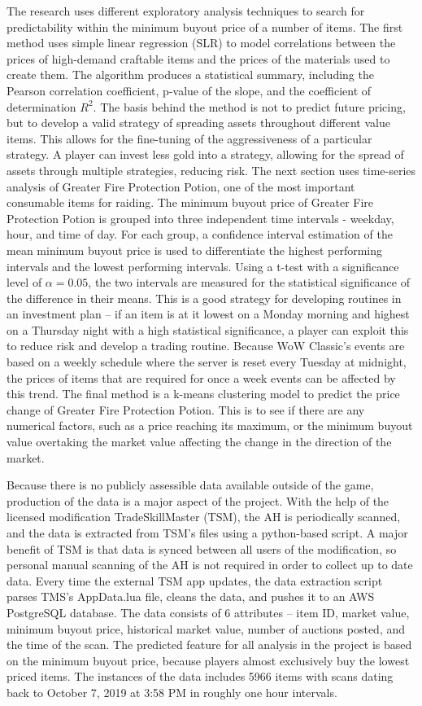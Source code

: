 \documentclass[sigconf]{acmart}
\begin{document}
The research uses different exploratory analysis techniques to search for predictability within the minimum buyout price of a number of items. The first method uses simple linear regression (SLR) to model correlations between the prices of high-demand craftable items and the prices of the materials used to create them. The algorithm produces a statistical summary, including the Pearson correlation coefficient, p-value of the slope, and the coefficient of determination \( R^2 \). The basis behind the method is not to predict future pricing, but to develop a valid strategy of spreading assets throughout different value items. This allows for the fine-tuning of the aggressiveness of a particular strategy. A player can invest less gold into a strategy, allowing for the spread of assets through multiple strategies, reducing risk. The next section uses time-series analysis of Greater Fire Protection Potion, one of the most important consumable items for raiding. The minimum buyout price of Greater Fire Protection Potion is grouped into three independent time intervals - weekday, hour, and time of day. For each group, a confidence interval estimation of the mean minimum buyout price is used to differentiate the highest performing intervals and the lowest performing intervals. Using a t-test with a significance level of \( \alpha = 0.05 \), the two intervals are measured for the statistical significance of the difference in their means. This is a good strategy for developing routines in an investment plan – if an item is at it lowest on a Monday morning and highest on a Thursday night with a high statistical significance, a player can exploit this to reduce risk and develop a trading routine. Because WoW Classic’s events are based on a weekly schedule where the server is reset every Tuesday at midnight, the prices of items that are required for once a week events can be affected by this trend. The final method is a k-means clustering model to predict the price change of Greater Fire Protection Potion. This is to see if there are any numerical factors, such as a price reaching its maximum, or the minimum buyout value overtaking the market value affecting the change in the direction of the market.

Because there is no publicly assessible data available outside of the game, production of the data is a major aspect of the project. With the help of the licensed modification TradeSkillMaster (TSM), the AH is periodically scanned, and the data is extracted from TSM’s files using a python-based script. A major benefit of TSM is that data is synced between all users of the modification, so personal manual scanning of the AH is not required in order to collect up to date data. Every time the external TSM app updates, the data extraction script parses TMS’s AppData.lua file, cleans the data, and pushes it to an AWS PostgreSQL database. The data consists of 6 attributes – item ID, market value, minimum buyout price, historical market value, number of auctions posted, and the time of the scan. The predicted feature for all analysis in the project is based on the minimum buyout price, because players almost exclusively buy the lowest priced items. The instances of the data includes 5966 items with scans dating back to October 7, 2019 at 3:58 PM in roughly one hour intervals.
\end{document}
